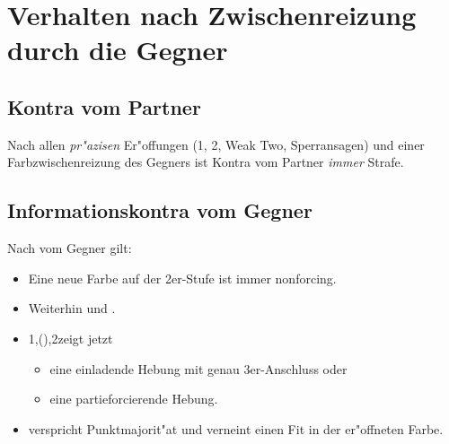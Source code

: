 \newpage

\section{Verhalten nach Zwischenreizung durch die
  Gegner\label{zwischenreizung}}

\subsection{Kontra vom Partner}

Nach allen \emph{pr"azisen} Er"offungen (1\SA, 2\SA, Weak Two, Sperransagen)
und einer Farbzwischenreizung des Gegners ist Kontra vom Partner \emph{immer}
Strafe.

\subsection{Informationskontra vom Gegner}

Nach  vom Gegner gilt:
\begin{itemize}
\item Eine neue Farbe auf der 2er-Stufe ist immer nonforcing.
\item Weiterhin  und .
\item 1\of{}\sep(\kontra){}\sep2\SA zeigt jetzt
  \begin{itemize}
    \item eine einladende Hebung mit genau 3er-Anschluss oder
    \item eine partieforcierende Hebung.
  \end{itemize}
\item {} verspricht Punktmajorit"at und verneint einen Fit in der
  er"offneten Farbe.
\end{itemize}

